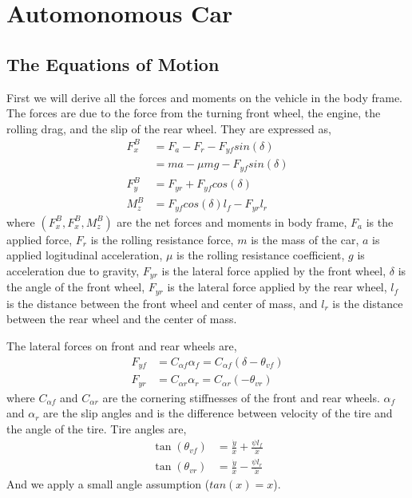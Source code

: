 \documentclass{article}
\begin{document}
\section{Automonomous Car}

\subsection{The Equations of Motion}

First we will derive all the forces and moments on the vehicle in the body frame. The forces are due to the force from
the turning front wheel, the engine, the rolling drag, and the slip of the rear wheel. They are expressed as,
\begin{align}
    F^B_x &= F_a - F_r - F_{yf}sin(\delta) \\
    &= ma - \mu mg - F_{yf}sin(\delta) \\
    F^B_y &= F_{yr} + F_{yf}cos(\delta) \\
    M^B_z & = F_{yf}cos(\delta)l_f - F_{yr}l_r
\end{align}
where $(F^B_x, F^B_x, M^B_z)$ are the net forces and moments in body frame, $F_a$ is the applied force, $F_r$ is the
rolling resistance force, $m$ is the mass of the car, $a$ is applied logitudinal acceleration, $\mu$ is the rolling
resistance coefficient, $g$ is acceleration due to gravity, $F_{yr}$ is the lateral force applied by the front wheel,
$\delta$ is the angle of the front wheel, $F_{yr}$ is the lateral force applied by the rear wheel, $l_f$ is the
distance between the front wheel and center of mass, and $l_r$ is the distance between the rear wheel and the center of
mass.

The lateral forces on front and rear wheels are,
\begin{align}
    F_{yf} &= C_{\alpha f}\alpha_f = C_{\alpha f}(\delta - \theta_{vf}) \\
    F_{yr} &= C_{\alpha r}\alpha_r = C_{\alpha r}(- \theta_{vr})
\end{align}
where $C_{\alpha f}$ and $C_{\alpha r}$ are the cornering stiffnesses of the front and rear wheels. $\alpha_f$ and
$\alpha_r$ are the slip angles and is the difference between velocity of the tire and the angle of the tire. Tire
angles are,
\begin{align}
    \tan(\theta_{vf}) &= \frac{\dot{y}}{\dot{x}} + \frac{\psi l_f}{\dot{x}} \\
    \tan(\theta_{vr}) &= \frac{\dot{y}}{\dot{x}} - \frac{\psi l_r}{\dot{x}}
\end{align}
And we apply a small angle assumption ($tan(x) = x$).
\end{document}
